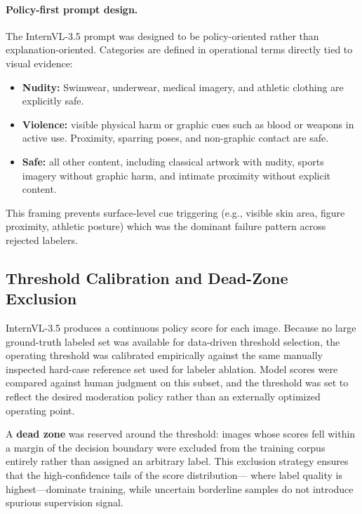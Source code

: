 \paragraph{Policy-first prompt design.}
The InternVL-3.5 prompt was designed to be policy-oriented rather than
explanation-oriented. Categories are defined in operational terms directly tied
to visual evidence:

\begin{itemize}[leftmargin=1.2em,itemsep=2pt,topsep=2pt]
  \item \textbf{Nudity:} Swimwear, underwear,
        medical imagery, and athletic clothing are explicitly safe.
  \item \textbf{Violence:} visible physical harm or graphic cues such as
        blood or weapons in active use. Proximity, sparring poses, and
        non-graphic contact are safe.
  \item \textbf{Safe:} all other content, including classical artwork with
        nudity, sports imagery without graphic harm, and intimate proximity
        without explicit content.
\end{itemize}

This framing prevents surface-level cue triggering (e.g., visible skin area,
figure proximity, athletic posture) which was the dominant failure pattern
across rejected labelers.

\subsection{Threshold Calibration and Dead-Zone Exclusion}
\label{app:threshold_calibration}

InternVL-3.5 produces a continuous policy score for each image. Because no
large ground-truth labeled set was available for data-driven threshold
selection, the operating threshold was calibrated empirically against the
same manually inspected hard-case reference set used for labeler ablation.
Model scores were compared against human judgment on this subset, and the
threshold was set to reflect the desired moderation policy rather than an
externally optimized operating point.

A \textbf{dead zone} was reserved around the threshold: images whose scores
fell within a margin of the decision boundary were excluded from the training
corpus entirely rather than assigned an arbitrary label. This exclusion
strategy ensures that the high-confidence tails of the score distribution---
where label quality is highest---dominate training, while uncertain borderline
samples do not introduce spurious supervision signal.

